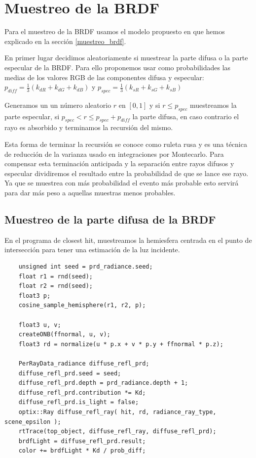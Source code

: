 \clearpage

\section{Muestreo de la BRDF}

Para el muestreo de la BRDF usamos el modelo propuesto en \cite{Lafortune1994} que hemos explicado en la sección \ref{muestreo_brdf}.
\medskip

En primer lugar decidimos aleatoriamente si muestrear la parte difusa o la parte especular de la BRDF. Para ello proponemos usar como probabilidades las medias de los valores RGB de las componentes difusa y especular: $p_{diff} =\frac{1}{3}( k_{dR} + k_{dG} + k_{dB})$ y $p_{spec} =\frac{1}{3}( k_{sR} + k_{sG} + k_{sB})$ 

\medskip

Generamos un un número aleatorio $r$ en $[0,1]$ y si $r \leq p_{spec}$ muestreamos la parte especular, si $p_{spec} < r \leq p_{spec} + p_{diff}$ la parte difusa, en caso contrario el rayo es absorbido y terminamos la recursión del mismo.

\medskip

Esta forma de terminar la recursión se conoce como ruleta rusa y es una técnica de reducción de la varianza usado en integraciones por Montecarlo. Para compensar esta terminación anticipada y la separación entre rayos difusos y especular dividiremos el resultado entre la probabilidad de que se lance ese rayo. Ya que se muestrea con más probabilidad el evento más probable esto servirá para dar más peso a aquellas muestras menos probables.

\subsection{Muestreo de la parte difusa de la BRDF}
En el programa de closest hit, muestreamos la hemiesfera centrada en el punto de intersección para tener una estimación de la luz incidente.

\begin{lstlisting}
	unsigned int seed = prd_radiance.seed;
	float r1 = rnd(seed);
	float r2 = rnd(seed);
	float3 p;
	cosine_sample_hemisphere(r1, r2, p);
	
	float3 u, v;
	createONB(ffnormal, u, v);
	float3 rd = normalize(u * p.x + v * p.y + ffnormal * p.z);
		
	PerRayData_radiance diffuse_refl_prd;
	diffuse_refl_prd.seed = seed;
	diffuse_refl_prd.depth = prd_radiance.depth + 1;
	diffuse_refl_prd.contribution *= Kd;
	diffuse_refl_prd.is_light = false;
	optix::Ray diffuse_refl_ray( hit, rd, radiance_ray_type, scene_epsilon );
	rtTrace(top_object, diffuse_refl_ray, diffuse_refl_prd);
	brdfLight = diffuse_refl_prd.result;
	color += brdfLight * Kd / prob_diff;
\end{lstlisting}

